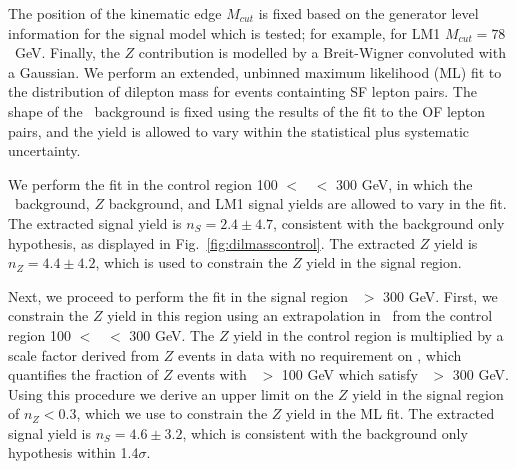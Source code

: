 The position of the kinematic edge $M_{cut}$ is fixed based on the generator level
information for the signal model which is tested; for example, for LM1 
$M_{cut} = 78$~GeV. Finally, the $Z$ contribution is modelled by a Breit-Wigner 
convoluted with a Gaussian. We perform an extended, unbinned maximum 
likelihood (ML) fit to the distribution of dilepton mass for events containting SF lepton pairs. 
The shape of the \ttbar\ background is fixed using the results of the fit to the OF lepton pairs,
and the yield is allowed to vary within the 
statistical plus systematic uncertainty. 

We perform the fit in the control region 100 $<$ \Ht\ $<$ 300 GeV, in
which the \ttbar\ background, $Z$ background, and LM1 signal yields are allowed to vary in the fit. 
The extracted signal yield is $n_S = 2.4 \pm 4.7$, consistent with the background only 
hypothesis, as displayed in Fig.~\ref{fig:dilmasscontrol}. 
The extracted $Z$ yield is $n_Z = 4.4 \pm 4.2$, which is 
used to constrain the $Z$ yield in the signal region. 

Next, we proceed to perform the fit in the signal region \Ht\ $>$ 300 GeV. First, we
constrain the $Z$ yield in this region using an extrapolation in \Ht\ from the 
control region 100 $<$ \Ht\ $<$ 300 GeV. The $Z$ yield in the control region is
multiplied by a scale factor derived from $Z$ events in data with no requirement
on \MET, which quantifies the fraction of $Z$ events with \Ht\ $>$ 100 GeV which 
satisfy \Ht\ $>$ 300 GeV. Using this procedure we derive an upper limit on the
$Z$ yield in the signal region of $n_Z < 0.3$, which we use to constrain the
$Z$ yield in the ML fit. The extracted signal yield is $n_S = 4.6 \pm 3.2$,
which is consistent with the background only hypothesis within 1.4$\sigma$. 





